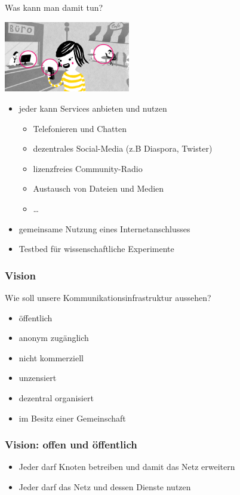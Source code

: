 \documentclass[handout, 10pt]{beamer}
\begin{document}
\begin{frame}{Was kann man damit tun?}
	\vfill
	\begin{center}
		\includegraphics[width=5.5cm]{images/verbindet}
	\end{center}
	
	\begin{itemize}[<+->]
		\item jeder kann Services anbieten und nutzen
		\begin{itemize}
			\item Telefonieren und Chatten
			\item dezentrales Social-Media (z.B Diaspora, Twister)
			\item lizenzfreies Community-Radio
			\item Austausch von Dateien und Medien
			\item \ldots
		\end{itemize}
		\item gemeinsame Nutzung eines Internetanschlusses
		\item Testbed f\"ur wissenschaftliche Experimente
	\end{itemize}
	\vfill
\end{frame}

\begin{frame}
	\frametitle{Vision}
	
	Wie soll unsere Kommunikationsinfrastruktur aussehen?
	
	\begin{itemize}[<+->]
		\item öffentlich
		\item anonym zugänglich
		\item nicht kommerziell
		\item unzensiert
		\item dezentral organisiert
		\item im Besitz einer Gemeinschaft
	\end{itemize}
\end{frame}

\begin{frame}
	\frametitle{Vision: offen und öffentlich}
	
	\begin{itemize}[<+->]
		\item Jeder darf Knoten betreiben und damit das Netz erweitern
		\item Jeder darf das Netz und dessen Dienste nutzen
	\end{itemize}
\end{frame}
\end{document}
